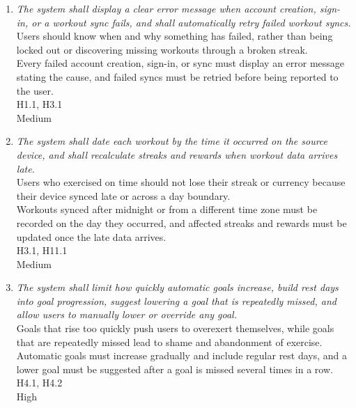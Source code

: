 \documentclass{article}
\begin{document}
\begin{enumerate}[{SR}1:]
\item \hypertarget{sr4}{}\emph{The system shall display a clear error message when account creation, sign-in, or a workout sync fails, and shall automatically retry failed workout syncs.}\\
     Users should know when and why something has failed, rather than being locked out or discovering missing workouts through a broken streak.\\
     Every failed account creation, sign-in, or sync must display an error message stating the cause, and failed syncs must be retried before being reported to the user.\\
     H1.1, H3.1\\
     Medium

\item \hypertarget{sr5}{}\emph{The system shall date each workout by the time it occurred on the source device, and shall recalculate streaks and rewards when workout data arrives late.}\\
     Users who exercised on time should not lose their streak or currency because their device synced late or across a day boundary.\\
     Workouts synced after midnight or from a different time zone must be recorded on the day they occurred, and affected streaks and rewards must be updated once the late data arrives.\\
     H3.1, H11.1\\
     Medium

\item \hypertarget{sr6}{}\emph{The system shall limit how quickly automatic goals increase, build rest days into goal progression, suggest lowering a goal that is repeatedly missed, and allow users to manually lower or override any goal.}\\
     Goals that rise too quickly push users to overexert themselves, while goals that are repeatedly missed lead to shame and abandonment of exercise.\\
     Automatic goals must increase gradually and include regular rest days, and a lower goal must be suggested after a goal is missed several times in a row.\\
     H4.1, H4.2\\
     High


\end{enumerate}
\end{document}
